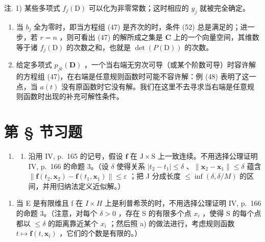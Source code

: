 注. 1) 某些多项式 \(f_{j}(\mathrm{D})\) 可以化为非零常数；这时相应的 \(y_{j}\) 就被完全确定。

\begin{enumerate}
\def\labelenumi{\arabic{enumi})}
\setcounter{enumi}{1}
\item
  当 \(b_{j}\) 全为零时，即当方程组 (47) 是齐次的时，条件 (52) 总是满足的；进一步，若 \(r = n\) ，则可看出 (47) 的解所成之集是 \(\mathbf{C}\) 上的一个向量空间，其维数等于诸 \(f_{j}(\mathrm{D})\) 的次数之和，也就是 \(\det(P(\mathrm{D}))\) 的次数。
\item
  给定多项式 \(p_{jk}(\mathbf{D})\) ，一个当右端无穷次可导（或某个阶数可导）时容许解的方程组 (47)，在右端是任意规则函数时可能不容许解：例 (48) 表明了这一点，当 \(a(t)\) 没有原函数时它没有解。我们在这里不去寻求当右端是任意规则函数时出现的补充可解性条件。
\end{enumerate}

\setcounter{exercisegroup}{0}
\section*{第 \S{} 节习题}
{}

\begin{enumerate}
\def\labelenumi{\arabic{enumi})}
\tightlist
\item
  \begin{enumerate}
  \def\labelenumii{\alph{enumii})}
  \tightlist
  \item
    沿用 IV, p.~165 的记号，假设 \(\mathbf{f}\) 在 \(\mathrm{J} \times \mathrm{S}\) 上一致连续。不用选择公理证明 IV, p.~166 的命题 3。（设 \(\delta\) 使得关系 \(|t_2 - t_1| \leqslant \delta\) 、\(\| \mathbf{x}_2 - \mathbf{x}_1 \| \leqslant \delta\) 蕴含 \(\| \mathbf{f}(t_2, \mathbf{x}_2) - \mathbf{f}(t_1, \mathbf{x}_1) \| \leqslant \varepsilon\) ；把 J 分成长度 \(\leqslant \inf(\delta, \delta / M)\) 的区间，并用归纳法定义近似解。）
  \end{enumerate}
\end{enumerate}

\begin{enumerate}
\def\labelenumi{\alph{enumi})}
\setcounter{enumi}{1}
\tightlist
\item
  当 E 是有限维且 f 在 \(I \times H\) 上是利普希茨的时，不用选择公理证明 IV, p.~166 的命题 3。（注意，对每个 \(\delta > 0\) ，存在 S 的有限多个点 \(x_{i}\) ，使得 S 的每个点都以 \(\leqslant \delta\) 的距离靠近某个 \(x_{i}\) ；然后照 a) 的做法进行，考虑规则函数 \(t \mapsto \mathbf{f}(t, \mathbf{x}_{i})\) ，它们的个数是有限的。）
\end{enumerate}

